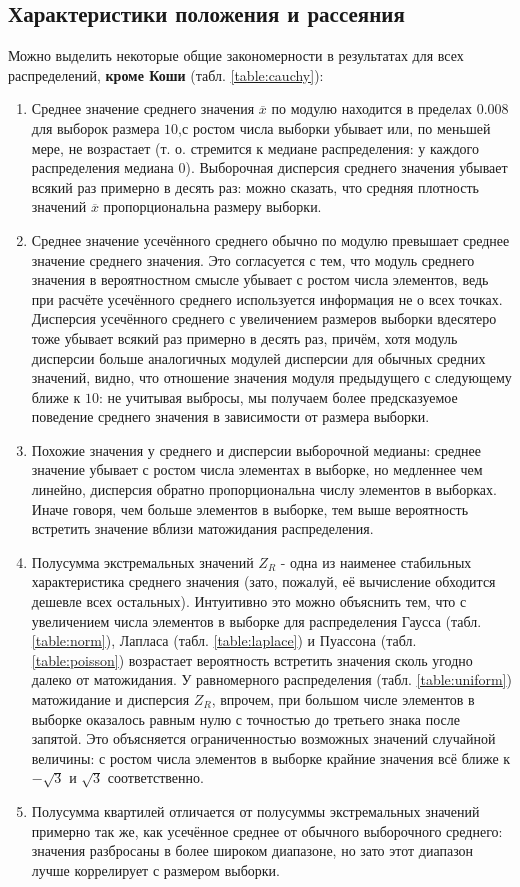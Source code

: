 \documentclass[zuev_report2.tex]{subfiles}
\begin{document}
\subsection{Характеристики положения и рассеяния}
Можно выделить некоторые общие закономерности в результатах для всех распределений, \textbf{кроме Коши} (табл. \ref{table:cauchy}):
\begin{enumerate}
	\item Среднее значение среднего значения $\overline{x}$ по модулю находится в пределах $0.008$ для выборок размера $10$,с ростом числа выборки убывает или, по меньшей мере, не возрастает (т. о. стремится к медиане распределения: у каждого распределения медиана $0$). Выборочная дисперсия среднего значения убывает всякий раз примерно в десять раз: можно сказать, что средняя плотность значений $\overline{x}$ пропорциональна размеру выборки.
	\item Среднее значение усечённого среднего обычно по модулю превышает среднее значение среднего значения. Это согласуется с тем, что модуль среднего значения в вероятностном смысле убывает с ростом числа элементов, ведь при расчёте усечённого среднего используется информация не о всех точках. Дисперсия усечённого среднего с увеличением размеров выборки вдесятеро тоже убывает всякий раз примерно в десять раз, причём, хотя модуль дисперсии больше аналогичных модулей дисперсии для обычных средних значений, видно, что отношение значения модуля предыдущего с следующему ближе к $10$: не учитывая выбросы, мы получаем более предсказуемое поведение среднего значения в зависимости от размера выборки. 
	\item Похожие значения у среднего и дисперсии выборочной медианы: среднее значение убывает с ростом числа элементах в выборке, но медленнее чем линейно, дисперсия обратно пропорциональна числу элементов в выборках. Иначе говоря, чем больше элементов в выборке, тем выше вероятность встретить значение вблизи матожидания распределения.
	\item Полусумма экстремальных значений $Z_R$ - одна из наименее стабильных характеристика среднего значения (зато, пожалуй, её вычисление обходится дешевле всех остальных). Интуитивно это можно объяснить тем, что с увеличением числа элементов в выборке для распределения Гаусса (табл. \ref{table:norm}), Лапласа (табл. \ref{table:laplace}) и Пуассона (табл. \ref{table:poisson}) возрастает вероятность встретить значения сколь угодно далеко от матожидания.  У равномерного распределения (табл. \ref{table:uniform}) матожидание и дисперсия $Z_R$, впрочем, при большом числе элементов в выборке оказалось равным нулю с точностью до третьего знака после запятой. Это объясняется ограниченностью возможных значений случайной величины: с ростом числа элементов в выборке крайние значения всё ближе к $-\sqrt{3}$ и $\sqrt{3}$ соответственно.
	\item Полусумма квартилей отличается от полусуммы экстремальных значений примерно так же, как усечённое среднее от обычного выборочного среднего: значения разбросаны в более широком диапазоне, но зато этот диапазон лучше коррелирует с размером выборки.
\end{enumerate}
\end{document}

